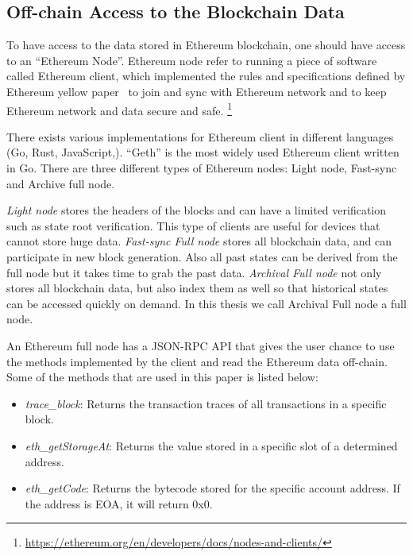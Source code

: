 \subsection{Off-chain Access to the Blockchain Data}\label{sec:nodes}

To have access to the data stored in Ethereum blockchain, one should have access to an ``Ethereum Node''. Ethereum node refer to running a piece of software called Ethereum client, which implemented the rules and specifications defined by Ethereum yellow paper~\cite{wood2014ethereum} to join and sync with Ethereum network and to keep Ethereum network and data secure and safe.
\footnote{\url{https://ethereum.org/en/developers/docs/nodes-and-clients/}} 

There exists various implementations for Ethereum client in different languages (\eg Go, Rust, JavaScript,\etc). ``Geth'' is the most widely used Ethereum client written in Go. 
There are three different types of Ethereum nodes: Light node, Fast-sync and Archive full node.

\textit{Light node} stores the headers of the blocks and can have a limited verification such as state root verification. This type of clients are useful for devices that cannot store huge data.
\textit{Fast-sync Full node} stores all blockchain data, and can participate in new block generation. Also all past states can be derived from the full node but it takes time to grab the past data.
\textit{Archival Full node} not only stores all blockchain data, but also index them as well so that historical states can be accessed quickly on demand. In this thesis we call Archival Full node a
full node. 

An Ethereum full node has a JSON-RPC API that gives the user chance to use the methods implemented by the client and read the Ethereum data off-chain. Some of the methods that are used in this paper is listed below:

\begin{itemize}
    \item \emph{trace\_block}: Returns the transaction traces of all transactions in a specific block.
    \item \emph{eth\_getStorageAt}: Returns the value stored in a specific slot of a determined address. 
    \item \emph{eth\_getCode}: Returns the bytecode stored for the specific account address. If the address is EOA, it will return 0x0.
\end{itemize}

